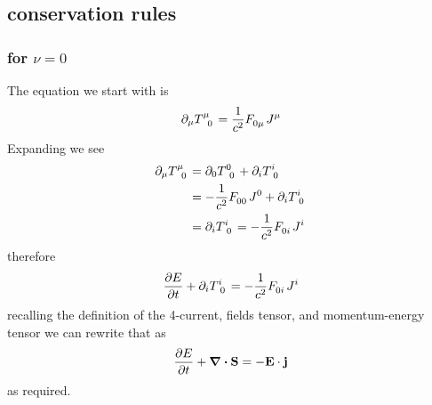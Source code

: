 \subsection{conservation rules}
\subsubsection{for $\nu = 0$}
The equation we start with is
\begin{equation}
  \partial_\mu\tensor{T}{^\mu_0} = \frac{1}{c^2}\tensor{F}{_0_\mu}J^\mu
\end{equation}
Expanding we see
\begin{align}
	\partial_\mu\tensor{T}{^\mu_0}&=\partial_0\tensor{T}{^0_0}+\partial_i\tensor{T}{^i_0}\\
	&= -\frac{1}{c^2}\tensor{F}{_0_0}J^0+\partial_i\tensor{T}{^i_0}\\
	&= \partial_i\tensor{T}{^i_0}=-\frac{1}{c^2}\tensor{F}{_0_i}J^i\\
\end{align}
therefore
\begin{equation}
  \diffp{E}{t}+\partial_i\tensor{T}{^i_0}=-\frac{1}{c^2}\tensor{F}{_0_i}J^i
\end{equation}
recalling the definition of the 4-current, fields tensor, and momentum-energy tensor we can rewrite that as
\begin{equation}
  \diffp{E}{t}+\div{\vb{S}}=-\vb{E}\cdot \vb{j}
\end{equation}
as required.
